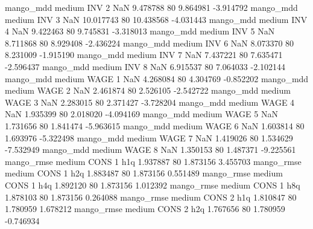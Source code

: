         mango_mdd     medium      INV                 2                  NaN  9.478788 80       9.864981          -3.914792
        mango_mdd     medium      INV                 3                  NaN 10.017743 80      10.438568          -4.031443
        mango_mdd     medium      INV                 4                  NaN  9.422463 80       9.745831          -3.318013
        mango_mdd     medium      INV                 5                  NaN  8.711868 80       8.929408          -2.436224
        mango_mdd     medium      INV                 6                  NaN  8.073370 80       8.231009          -1.915190
        mango_mdd     medium      INV                 7                  NaN  7.437221 80       7.635471          -2.596437
        mango_mdd     medium      INV                 8                  NaN  6.915537 80       7.064033          -2.102144
        mango_mdd     medium     WAGE                 1                  NaN  4.268084 80       4.304769          -0.852202
        mango_mdd     medium     WAGE                 2                  NaN  2.461874 80       2.526105          -2.542722
        mango_mdd     medium     WAGE                 3                  NaN  2.283015 80       2.371427          -3.728204
        mango_mdd     medium     WAGE                 4                  NaN  1.935399 80       2.018020          -4.094169
        mango_mdd     medium     WAGE                 5                  NaN  1.731656 80       1.841474          -5.963615
        mango_mdd     medium     WAGE                 6                  NaN  1.603814 80       1.693976          -5.322498
        mango_mdd     medium     WAGE                 7                  NaN  1.419026 80       1.534629          -7.532949
        mango_mdd     medium     WAGE                 8                  NaN  1.350153 80       1.487371          -9.225561
       mango_rmse     medium     CONS                 1                  h1q  1.937887 80       1.873156           3.455703
       mango_rmse     medium     CONS                 1                  h2q  1.883487 80       1.873156           0.551489
       mango_rmse     medium     CONS                 1                  h4q  1.892120 80       1.873156           1.012392
       mango_rmse     medium     CONS                 1                  h8q  1.878103 80       1.873156           0.264088
       mango_rmse     medium     CONS                 2                  h1q  1.810847 80       1.780959           1.678212
       mango_rmse     medium     CONS                 2                  h2q  1.767656 80       1.780959          -0.746934
